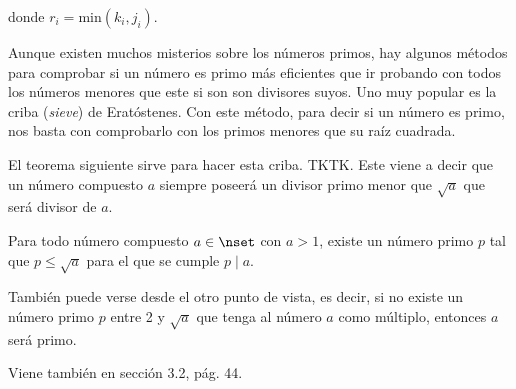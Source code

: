 \noindent donde $r_i = \text{min}(k_i, j_i)$.

Aunque existen muchos misterios sobre los números primos, hay algunos
métodos para comprobar si un número es primo más eficientes que ir probando
con todos los números menores que este si son son divisores suyos. Uno muy
popular es la criba (\emph{sieve}) de Eratóstenes. Con este método, para
decir si un número es primo, nos basta con comprobarlo con los primos
menores que su raíz cuadrada.

El teorema siguiente sirve para hacer esta criba. TKTK. Este viene a decir
que un número compuesto $a$ siempre poseerá un divisor primo menor que
$\sqrt{a}$ que será divisor de $a$.

\begin{theorem}
  Para todo número compuesto $a \in \nset$ con $a > 1$, existe un número
  primo $p$ tal que $p \leq \sqrt{a}$ para el que se cumple $p \mid a$.
\end{theorem}

También puede verse desde el otro punto de vista, es decir, si no existe un
número primo $p$ entre 2 y $\sqrt{a}$ que tenga al número $a$ como múltiplo,
entonces $a$ será primo.

Viene también en \cite{burton} sección 3.2, pág. 44.

